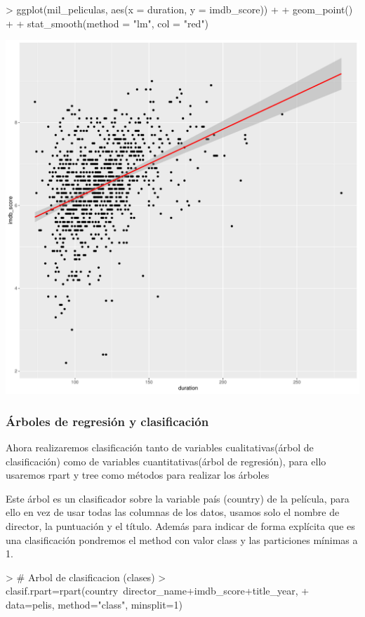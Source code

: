 \documentclass[a4paper]{article}
\begin{document}
\begin{Schunk}
\begin{Sinput}
> ggplot(mil_peliculas, aes(x = duration, y = imdb_score)) + 
+   geom_point() +
+   stat_smooth(method = "lm", col = "red")
\end{Sinput}
\end{Schunk}
\includegraphics{practica-3-regresion2}

\subsubsection{Árboles de regresión y clasificación}
Ahora realizaremos clasificación tanto de variables cualitativas(árbol de clasificación) como de variables cuantitativas(árbol de regresión), para ello usaremos rpart y tree como métodos para realizar los árboles

Este árbol es un clasificador sobre la variable país (country) de la película, para ello en vez de usar todas las columnas de los datos, usamos solo el nombre de director, la puntuación y el título. Además para indicar de forma explícita que es una clasificación pondremos el method con valor class y las particiones mínimas a 1.
\begin{Schunk}
\begin{Sinput}
> # Arbol de clasificacion (clases)
> clasif.rpart=rpart(country~director_name+imdb_score+title_year,
+                    data=pelis, method="class", minsplit=1)
\end{Sinput}
\end{Schunk}
\end{document}
